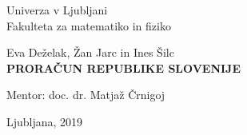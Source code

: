\documentclass[12pt, a4paper]{article}
\begin{document}
\begin{titlepage}
\begin{center}

\large
Univerza v Ljubljani\\
\normalsize
Fakulteta za matematiko in fiziko\\

\vspace{3 cm} 

\large
Eva Deželak, Žan Jarc in Ines Šilc\\

\vspace{0.5cm}
\LARGE
\textbf{PRORAČUN REPUBLIKE SLOVENIJE}

\vspace{0.5 cm}
\normalsize


\vspace{1.5cm}
\normalsize
Mentor: doc. dr. Matjaž Črnigoj

\vspace{3cm}


\vfill

\large Ljubljana, 2019

\end{center}
\end{titlepage}



\newpage
\end{document}
